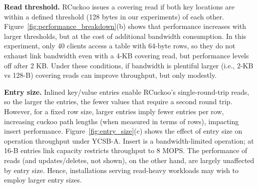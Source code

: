 \textbf{Read threshold.}
\label{sec:read_threshold}
RCuckoo issues a covering
read if both key locations are within a defined threshold (128 bytes
in our experiments) of each other.
Figure~\ref{fig:performance_breakdown}(b) shows that performance
increases with larger thresholds, but at the cost of additional
bandwidth consumption.  In this experiment, only 40 clients
access a table with 64-byte rows, so they do not exhaust link bandwidth even with a 4-KB covering read, but performance levels off after 2 KB.
Under these conditions, if bandwidth is plentiful larger (i.e., 2-KB
vs 128-B) covering reads can improve throughput, but only modestly.



\textbf{Entry size.}  Inlined key/value entries enable RCuckoo's
single-round-trip reads, so the larger the entries, the fewer values
that require a second round trip.  However, for a fixed row size,
larger entries imply fewer entries per row, increasing cuckoo path
lengths (when measured in terms of rows), impacting insert performance.
Figure~\ref{fig:entry_size}(c) shows the effect of entry size on
operation throughput under YCSB-A. Insert is a bandwidth-limited
operation;
at 16-B entries link capacity restricts throughput to 8 MOPS. The
performance of reads (and updates/deletes, not shown), on the other
hand, are largely unaffected by entry size.  Hence,
installations serving read-heavy workloads may wish to employ larger
entry sizes.
%





